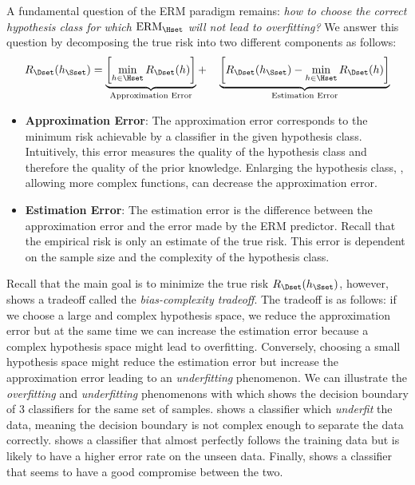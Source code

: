 A fundamental question of the ERM paradigm remains: \emph{how to choose the correct hypothesis class for which $\text{ERM}_\Hset$ will not lead to overfitting?} 
We answer this question by decomposing the true risk into two different components as follows: 
\begin{equation} \label{equation:ch2-bias_complexity_tradeoff}
  R_\Dset (h_\Sset) = 
  \underbrace{\left[ \min_{h \in \Hset} R_\Dset(h) \right]}_{\text{\scriptsize Approximation Error}} + \quad 
  \underbrace{\left[ R_\Dset(h_\Sset) - \min_{h \in \Hset} R_\Dset(h) \right]}_{\text{\scriptsize Estimation Error}} 
\end{equation}
\begin{itemize}
  \item \textbf{Approximation Error}: The approximation error corresponds to the minimum risk achievable by a classifier in the given hypothesis class.
  Intuitively, this error measures the quality of the hypothesis class and therefore the quality of the prior knowledge.
  Enlarging the hypothesis class, \ie, allowing more complex functions, can decrease the approximation error.
  \item \textbf{Estimation Error}: The estimation error is the difference between the approximation error and the error made by the ERM predictor.
  Recall that the empirical risk is only an estimate of the true risk.
  This error is dependent on the sample size and the complexity of the hypothesis class.
\end{itemize}
Recall that the main goal is to minimize the true risk $R_\Dset (h_\Sset)$, however,  shows a tradeoff called the \emph{bias-complexity tradeoff}.
The tradeoff is as follows: if we choose a large and complex hypothesis space, we reduce the approximation error but at the same time we can increase the estimation error because a complex hypothesis space might lead to overfitting.
Conversely, choosing a small hypothesis space might reduce the estimation error but increase the approximation error leading to an \emph{underfitting} phenomenon.
We can illustrate the \emph{overfitting} and \emph{underfitting} phenomenons with  which shows the decision boundary of 3 classifiers for the same set of samples.
 shows a classifier which \emph{underfit} the data, meaning the decision boundary is not complex enough to separate the data correctly.
 shows a classifier that almost perfectly follows the training data but is likely to have a higher error rate on the unseen data.
Finally,  shows a classifier that seems to have a good compromise between the two.


